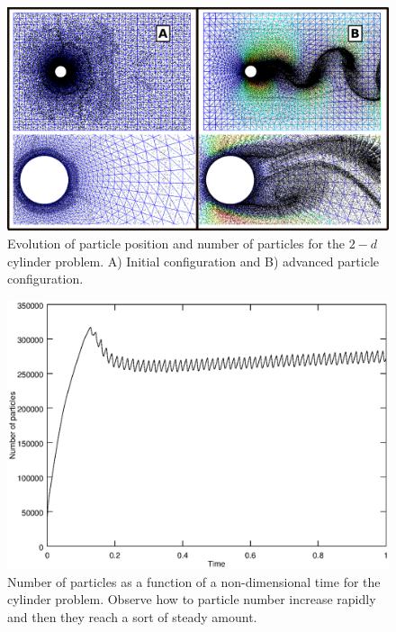 \begin{figure}[htp]
\centering 
\includegraphics[scale=.6]{./imgs/cyl_parts.png}
\caption{Evolution of particle position and number of particles for the $2-d$ cylinder problem. A) Initial configuration and B) advanced particle configuration. }
\label{fig:cyl_evol}
\end{figure}

\begin{figure}[htp] 
\centering 
\includegraphics[scale=.4]{./imgs/npart_cyl.eps}
\caption{Number of particles as a function of a non-dimensional time for the cylinder problem. Observe how to particle number increase rapidly and then they reach a sort of steady amount.}
\label{fig:cyl_npart}
\end{figure}


